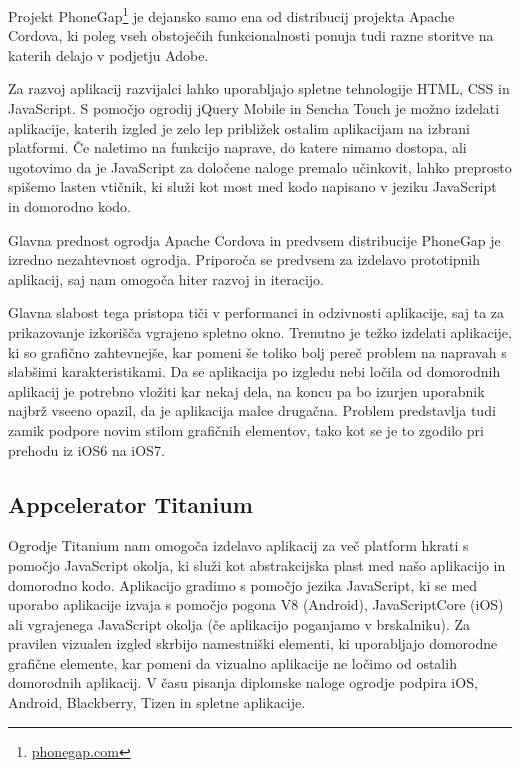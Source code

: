 Projekt PhoneGap\footnote{\href{http://phonegap.com}{phonegap.com}} je dejansko samo ena od distribucij projekta Apache Cordova, ki poleg vseh obstoječih funkcionalnosti ponuja tudi razne storitve na katerih delajo v podjetju Adobe.

Za razvoj aplikacij razvijalci lahko uporabljajo spletne tehnologije HTML, CSS in JavaScript. S pomočjo ogrodij jQuery Mobile in Sencha Touch je možno izdelati aplikacije, katerih izgled je zelo lep približek ostalim aplikacijam na izbrani platformi. Če naletimo na funkcijo naprave, do katere nimamo dostopa, ali ugotovimo da je JavaScript za določene naloge premalo učinkovit, lahko preprosto spišemo lasten vtičnik, ki služi kot most med kodo napisano v jeziku JavaScript in domorodno kodo.

Glavna prednost ogrodja Apache Cordova in predvsem distribucije PhoneGap je izredno nezahtevnost ogrodja. Priporoča se predvsem za izdelavo prototipnih aplikacij, saj nam omogoča hiter razvoj in iteracijo.

Glavna slabost tega pristopa tiči v performanci in odzivnosti aplikacije, saj ta za prikazovanje izkorišča vgrajeno spletno okno. Trenutno je težko izdelati aplikacije, ki so grafično zahtevnejše, kar pomeni še toliko bolj pereč problem na napravah s slabšimi karakteristikami. Da se aplikacija po izgledu nebi ločila od domorodnih aplikacij je potrebno vložiti kar nekaj dela, na koncu pa bo izurjen uporabnik najbrž vseeno opazil, da je aplikacija malce drugačna. Problem predstavlja tudi zamik podpore novim stilom grafičnih elementov, tako kot se je to zgodilo pri prehodu iz iOS6 na iOS7.

\subsection{Appcelerator Titanium}

Ogrodje Titanium nam omogoča izdelavo aplikacij za več platform hkrati s pomočjo JavaScript okolja, ki služi kot abstrakcijska plast med našo aplikacijo in domorodno kodo. Aplikacijo gradimo s pomočjo jezika JavaScript, ki se med uporabo aplikacije izvaja s pomočjo pogona V8 (Android), JavaScriptCore (iOS) ali vgrajenega JavaScript okolja (če aplikacijo poganjamo v brskalniku). Za pravilen vizualen izgled skrbijo namestniški elementi, ki uporabljajo domorodne grafične elemente, kar pomeni da vizualno aplikacije ne ločimo od ostalih domorodnih aplikacij. V času pisanja diplomske naloge ogrodje podpira iOS, Android, Blackberry, Tizen in spletne aplikacije.

